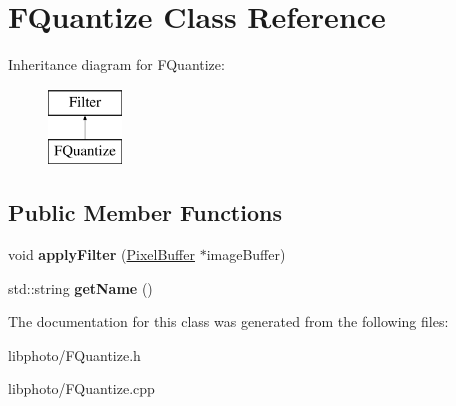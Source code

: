 \hypertarget{classFQuantize}{\section{F\-Quantize Class Reference}
\label{classFQuantize}
}
Inheritance diagram for F\-Quantize\-:\begin{figure}[H]
\begin{center}
\leavevmode
\includegraphics[height=2.000000cm]{classFQuantize}
\end{center}
\end{figure}
\subsection*{Public Member Functions}
\begin{DoxyCompactItemize}
\item 
\hypertarget{classFQuantize_a093d0f34480882da50d994eb4e450c64}{void {\bfseries apply\-Filter} (\hyperlink{classPixelBuffer}{Pixel\-Buffer} $\ast$image\-Buffer)}\label{classFQuantize_a093d0f34480882da50d994eb4e450c64}

\item 
\hypertarget{classFQuantize_a9432e52568e0b7608522569e0a438a1d}{std\-::string {\bfseries get\-Name} ()}\label{classFQuantize_a9432e52568e0b7608522569e0a438a1d}

\end{DoxyCompactItemize}


The documentation for this class was generated from the following files\-:\begin{DoxyCompactItemize}
\item 
libphoto/F\-Quantize.\-h\item 
libphoto/F\-Quantize.\-cpp\end{DoxyCompactItemize}
